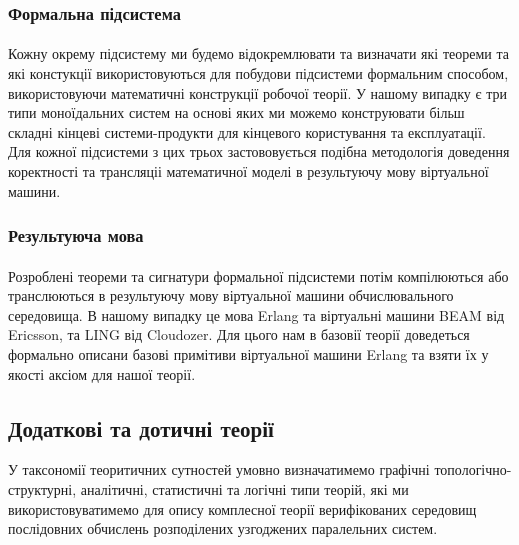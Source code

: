 \documentclass[11pt,oneside]{article}
\begin{document}
\subsubsection{Формальна підсистема}

   \paragraph{}
   Кожну окрему підсистему ми будемо відокремлювати та визначати які теореми
   та які констукції використовуються для побудови підсистеми формальним способом,
   використовуючи математичні конструкції робочої теорії. У нашому випадку є три
   типи моноїдальних систем на основі яких ми можемо конструювати більш складні
   кінцеві системи-продукти для кінцевого користування та експлуатації.
   Для кожної підсистеми з цих трьох застововується подібна методологія
   доведення коректності та трансляціі математичної моделі в результуючу
   мову віртуальної машини.

\subsubsection{Результуюча мова}

   \paragraph{}
   Розроблені теореми та сигнатури
   формальної підсистеми потім компілюються або транслюються в результуючу мову віртуальної машини
   обчислювального середовища. В нашому випадку це мова Erlang та віртуальні
   машини BEAM від Ericsson, та LING від Cloudozer. Для цього нам в базовії теорії доведеться
   формально описани базові примітиви віртуальної машини Erlang та взяти їх
   у якості аксіом для нашої теорії.

\newpage
\subsection{Додаткові та дотичні теорії}
\vspace{0.5cm}
   У таксономії теоритичних сутностей умовно визначатимемо
   графічні топологічно- структурні, аналітичні, статистичні та логічні типи теорій, які
   ми використовуватимемо для опису комплесної теорії верифікованих середовищ
   послідовних обчислень розподілених узгоджених паралельних систем.\\
\end{document}
